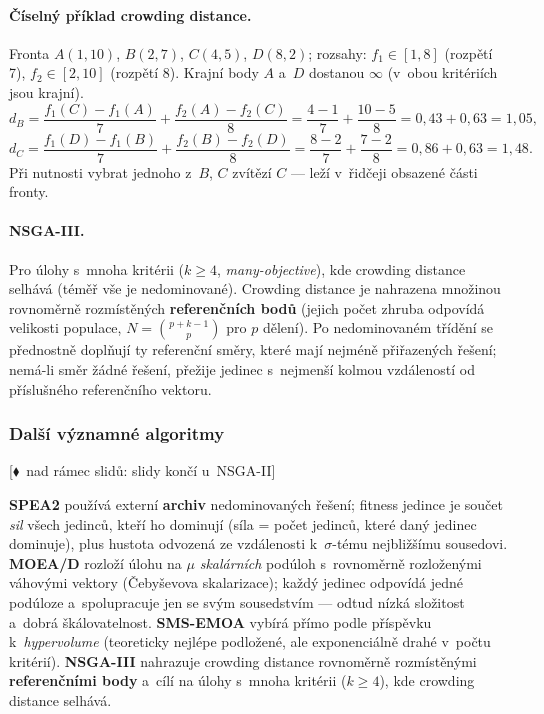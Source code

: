\documentclass[11pt,a4paper]{article}
\theoremstyle{definition}
\newcommand{\mimoq}[1]{\textcolor{markcol}{\textsf{\footnotesize[$\blacklozenge$~nad rámec slidů: #1]}}}
\begin{document}
\paragraph{Číselný příklad crowding distance.} Fronta
$A(1,10)$, $B(2,7)$, $C(4,5)$, $D(8,2)$; rozsahy: $f_1 \in [1,8]$
(rozpětí 7), $f_2 \in [2,10]$ (rozpětí 8). Krajní body $A$ a~$D$ dostanou
$\infty$ (v~obou kritériích jsou krajní).
\[
d_B = \frac{f_1(C)-f_1(A)}{7} + \frac{f_2(A)-f_2(C)}{8}
    = \frac{4-1}{7} + \frac{10-5}{8} = 0{,}43 + 0{,}63 = 1{,}05,
\]
\[
d_C = \frac{f_1(D)-f_1(B)}{7} + \frac{f_2(B)-f_2(D)}{8}
    = \frac{8-2}{7} + \frac{7-2}{8} = 0{,}86 + 0{,}63 = 1{,}48 .
\]
Při nutnosti vybrat jednoho z~$B$, $C$ zvítězí $C$ --- leží v~řidčeji
obsazené části fronty.

\paragraph{NSGA-III.} Pro úlohy s~mnoha kritérii ($k \ge 4$,
\emph{many-objective}), kde crowding distance selhává (téměř vše je
nedominované). Crowding distance je nahrazena množinou rovnoměrně
rozmístěných \textbf{referenčních bodů} (jejich počet zhruba odpovídá velikosti
populace, $N = \binom{p+k-1}{p}$ pro $p$ dělení). Po nedominovaném třídění se
přednostně doplňují ty referenční směry, které mají nejméně přiřazených
řešení; nemá-li směr žádné řešení, přežije jedinec s~nejmenší kolmou
vzdáleností od příslušného referenčního vektoru.

\subsubsection{Další významné algoritmy}

\noindent\mimoq{slidy končí u~NSGA-II}

\textbf{SPEA2} používá externí \textbf{archiv} nedominovaných řešení; fitness jedince je
součet \emph{sil} všech jedinců, kteří ho dominují (síla = počet jedinců, které daný jedinec
dominuje), plus hustota odvozená ze vzdálenosti k~$\sigma$-tému nejbližšímu sousedovi.
\textbf{MOEA/D} rozloží úlohu na $\mu$ \emph{skalárních} podúloh s~rovnoměrně rozloženými
váhovými vektory (Čebyševova skalarizace); každý jedinec odpovídá jedné podúloze
a~spolupracuje jen se svým sousedstvím --- odtud nízká složitost a~dobrá škálovatelnost.
\textbf{SMS-EMOA} vybírá přímo podle příspěvku k~\emph{hypervolume} (teoreticky nejlépe
podložené, ale exponenciálně drahé v~počtu kritérií). \textbf{NSGA-III} nahrazuje crowding
distance rovnoměrně rozmístěnými \textbf{referenčními body} a~cílí na úlohy s~mnoha kritérii
($k \ge 4$), kde crowding distance selhává.
\end{document}
